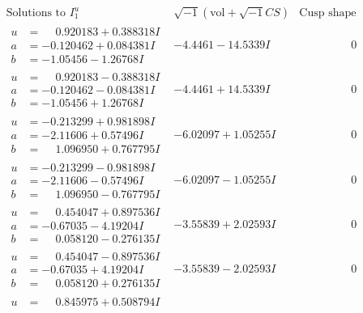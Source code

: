 \documentclass[1p]{elsarticle_modified}
\theoremstyle{definition}
\newcommand{\I}{\sqrt{-1}}
\begin{document}
$$\begin{array}{c|c|c}  
\text{Solutions to }I^u_{1}& \I (\text{vol} + \sqrt{-1}CS) & \text{Cusp shape}\\
 \hline 
\begin{aligned}
u &= \phantom{-}0.920183 + 0.388318 I \\
a &= -0.120462 + 0.084381 I \\
b &= -1.05456 - 1.26768 I\end{aligned}
 & -4.4461 - 14.5339 I & \phantom{-0.000000 } 0 \\ \hline\begin{aligned}
u &= \phantom{-}0.920183 - 0.388318 I \\
a &= -0.120462 - 0.084381 I \\
b &= -1.05456 + 1.26768 I\end{aligned}
 & -4.4461 + 14.5339 I & \phantom{-0.000000 } 0 \\ \hline\begin{aligned}
u &= -0.213299 + 0.981898 I \\
a &= -2.11606 + 0.57496 I \\
b &= \phantom{-}1.096950 + 0.767795 I\end{aligned}
 & -6.02097 + 1.05255 I & \phantom{-0.000000 } 0 \\ \hline\begin{aligned}
u &= -0.213299 - 0.981898 I \\
a &= -2.11606 - 0.57496 I \\
b &= \phantom{-}1.096950 - 0.767795 I\end{aligned}
 & -6.02097 - 1.05255 I & \phantom{-0.000000 } 0 \\ \hline\begin{aligned}
u &= \phantom{-}0.454047 + 0.897536 I \\
a &= -0.67035 - 4.19204 I \\
b &= \phantom{-}0.058120 - 0.276135 I\end{aligned}
 & -3.55839 + 2.02593 I & \phantom{-0.000000 } 0 \\ \hline\begin{aligned}
u &= \phantom{-}0.454047 - 0.897536 I \\
a &= -0.67035 + 4.19204 I \\
b &= \phantom{-}0.058120 + 0.276135 I\end{aligned}
 & -3.55839 - 2.02593 I & \phantom{-0.000000 } 0 \\ \hline\begin{aligned}
u &= \phantom{-}0.845975 + 0.508794 I \\

\end{aligned}
\end{array}$$
\end{document}

